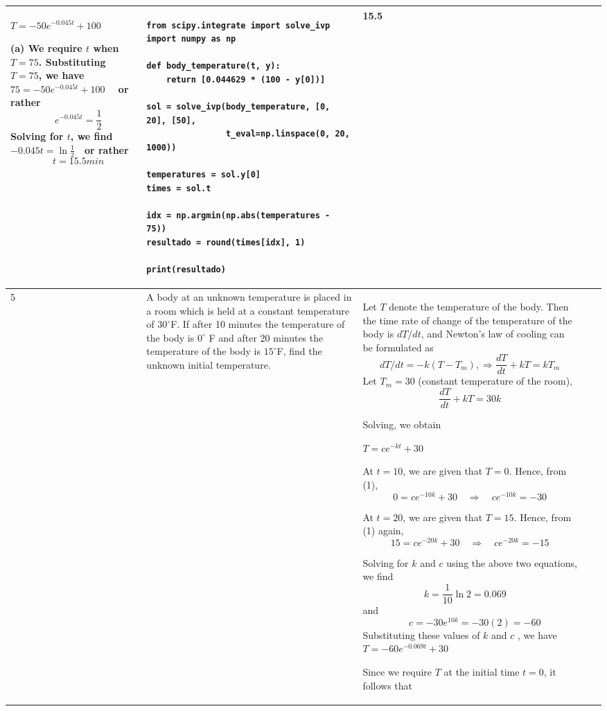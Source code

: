 \documentclass[a4paper,12pt]{article}
\begin{document}
\begin{longtable}{|p{0.3cm}|p{}|p{10cm}|p{}|p{1.5cm}|}
$T = -50e^{-0.045t} + 100$

(a) We require \( t \) when \( T = 75 \). Substituting \( T = 75 \), we have
$75 = -50e^{-0.045t} + 100 \quad$ or rather \[\quad e^{-0.045t} = \frac{1}{2}
\]
Solving for \( t \), we find
$-0.045t = \ln \frac{1}{2} \quad $or rather \[\quad t = 15.5  min
\]
           &\begin{verbatim}
from scipy.integrate import solve_ivp
import numpy as np

def body_temperature(t, y):
    return [0.044629 * (100 - y[0])]

sol = solve_ivp(body_temperature, [0, 20], [50],
                t_eval=np.linspace(0, 20, 1000))

temperatures = sol.y[0]
times = sol.t

idx = np.argmin(np.abs(temperatures - 75))
resultado = round(times[idx], 1)

print(resultado)
\end{verbatim}&  15.5                \\ \hline
     5            &     A body at an unknown temperature is placed in a room which is held at a constant temperature of \( 30^\circ \)F.  
If after 10 minutes the temperature of the body is \( 0^\circ \) F and after 20 minutes the temperature of the body is \( 15^\circ \)F, find the unknown initial temperature.              & Let \( T \) denote the temperature of the body. Then the time rate of change of the temperature of the body is \( dT/dt \), and Newton’s law of cooling can be formulated as  
\[
dT/dt = -k(T - T_m), \Rightarrow \frac{dT}{dt} + kT = kT_m
\]
Let  $T_m = 30$ (constant temperature of the room),  
\[
\frac{dT}{dt} + kT = 30k
\]

Solving, we obtain  

$T = ce^{-kt} + 30$


At \( t = 10 \), we are given that \( T = 0 \). Hence, from (1),  
\[
0 = ce^{-10k} + 30 \quad \Rightarrow \quad ce^{-10k} = -30
\]

At \( t = 20 \), we are given that \( T = 15 \). Hence, from (1) again,  
\[
15 = ce^{-20k} + 30 \quad \Rightarrow \quad ce^{-20k} = -15 
\]

Solving  for \( k \) and \( c \) using the above two equations, we find  
\[
k = \frac{1}{10} \ln 2 = 0.069 \quad\] and   \[\quad c = -30e^{10k} = -30(2) = -60
\]
Substituting these values of  \( k \) and \( c \) , we have 
$T = -60e^{-0.069t} + 30$

Since we require \( T \) at the initial time \( t = 0 \), it follows  that


\end{longtable}
\end{document}
